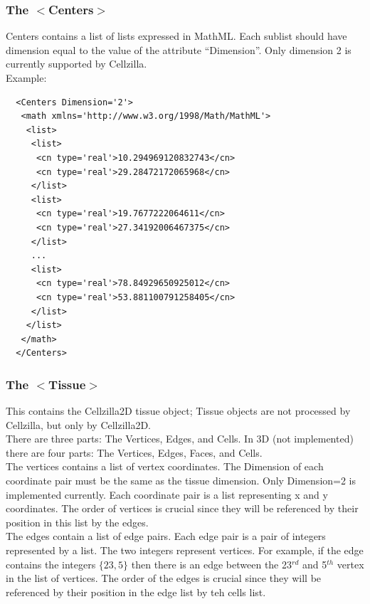 \documentclass[12pt,letterpaper]{article}
\begin{document}
\subsubsection{The $<$Centers$>$}
Centers contains a list of lists expressed in MathML. Each sublist should 
have dimension equal to the value of the attribute {\ttfamily ``Dimension''}. Only dimension 2 is currently supported by Cellzilla.\\

Example:
\begin{verbatim}
  <Centers Dimension='2'>
   <math xmlns='http://www.w3.org/1998/Math/MathML'>
    <list>
     <list>
      <cn type='real'>10.294969120832743</cn>
      <cn type='real'>29.28472172065968</cn>
     </list>
     <list>
      <cn type='real'>19.7677222064611</cn>
      <cn type='real'>27.34192006467375</cn>
     </list>
     ...
     <list>
      <cn type='real'>78.84929650925012</cn>
      <cn type='real'>53.881100791258405</cn>
     </list>
    </list>
   </math>
  </Centers>
\end{verbatim}

\subsubsection{The $<$Tissue$>$}

This contains the Cellzilla2D tissue object; Tissue objects are not processed by Cellzilla, but only by Cellzilla2D. \\

There are three parts: The Vertices, Edges, and Cells.  In 3D (not implemented) there are four parts: The Vertices, Edges, Faces, and Cells.\\

The vertices contains a list of vertex coordinates. The Dimension of each coordinate pair must be the same as the tissue dimension. Only Dimension=2 is implemented currently. Each coordinate pair is a list representing x and y coordinates. The order of vertices is crucial since they will be referenced by their position in this list by the edges.\\

The edges contain a list of edge pairs. Each edge pair is a pair of integers represented by a list. The two integers represent vertices. For example, if the edge contains the integers $\{23, 5\}$ then there is an edge between the 23$^{rd}$ and 5$^{th}$ vertex in the list of vertices. The order of the edges is crucial since they will be referenced by their position in the edge list by teh cells list.\\
\end{document}
